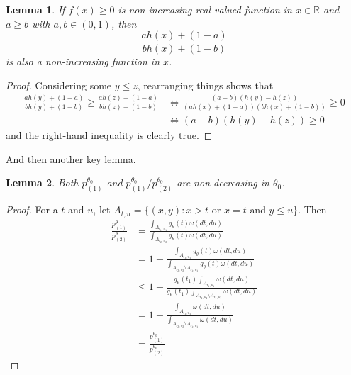 \documentclass{article}
\newtheorem{lemma}{Lemma}
\newcommand{\R}{\mathbb{R}}
\begin{document}
\begin{appendix}
\begin{lemma}
    \label{lem:analysis}
    If $f(x) \geq 0$ is non-increasing real-valued function in $x\in \R$ and $a \geq b$ with $a, b \in (0, 1)$, then 
    \begin{equation}
        \frac{a h(x) + (1-a)}{b h(x) + (1-b)}
    \end{equation}
    is also a non-increasing function in $x$.
\end{lemma}
\begin{proof}
    Considering some $y \leq z$, rearranging things shows that 
    \begin{align*}
        \frac{a h(y) + (1-a)}{b h(y) + (1-b)} \geq \frac{a h(z) + (1-a)}{b h(z) + (1-b)} &\iff \frac{(a - b)(h(y) - h(z)) }{(ah(x) + (1-a))(b h(x) + (1-b))} \geq 0\\
        &\iff (a - b)(h(y) - h(z)) \geq 0
    \end{align*}
    and the right-hand inequality is clearly true. 
\end{proof}

And then another key lemma. 

\begin{lemma}
    Both $p^{\theta_0}_{(1)}$ and $p^{\theta_0}_{(1)}/p^{\theta_0}_{(2)}$ are non-decreasing in $\theta_0$.  
\end{lemma}

\begin{proof}
    For a $t$ and $u$, let $A_{t, u} = \{(x, y) : x > t \text{ or } x = t \text{ and } y \leq u \}$. Then  
    \begin{align*}
        \frac{p^{\theta}_{(1)}}{p^{\theta}_{(2)}} &= \frac{ \int_{A_{t_1, u_1}}  g_{\theta}(t) \omega(dt, du)}{ \int_{A_{t_2, u_2}} g_{\theta}(t) \omega(dt, du)} \\
        &= 1 + \frac{ \int_{A_{t_1, u_1}}  g_{\theta}(t) \omega(dt, du)}{ \int_{A_{t_2, u_2} \setminus A_{t_1, u_1}} g_{\theta}(t) \omega(dt, du)} \\
        &\leq 1 + \frac{ g_{\theta}(t_1) \int_{A_{t_1, u_1}}   \omega(dt, du)}{ g_{\theta}(t_1)\int_{A_{t_2, u_2} \setminus A_{t_1, u_1}}  \omega(dt, du)} \\
        &= 1 + \frac{ \int_{A_{t_1, u_1}}   \omega(dt, du)}{ \int_{A_{t_2, u_2} \setminus A_{t_1, u_1}}  \omega(dt, du)} \\
        &=  \frac{p^{\theta_0}_{(1)}}{p^{\theta_0}_{(2)}}
    \end{align*}
\end{proof}


\end{appendix}
\end{document}
